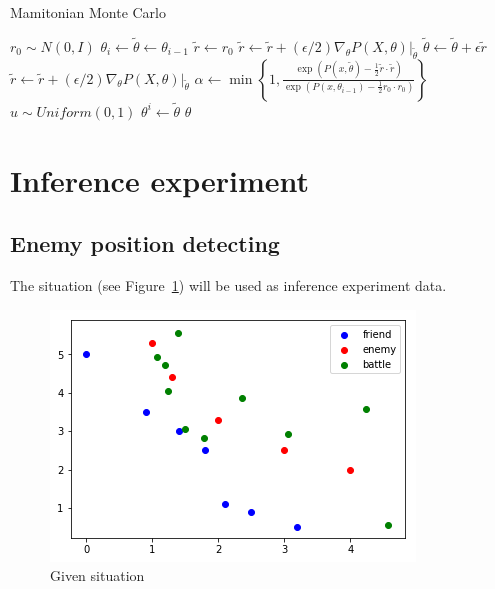 \documentclass{article}
\begin{document}
\begin{algorithm}
\caption{Mamitonian Monte Carlo}
\begin{algorithmic}[1]
        \State $r_0 \sim N(0,I)$
        \State $\theta_i \gets \tilde{\theta} \gets \theta_{i-1}$
        \State $\tilde{r} \gets r_0$
            \State $\tilde{r} \gets \tilde{r} + (\epsilon/2) \nabla_\theta P(X,\theta)|_{\tilde{\theta}}$
            \State $\tilde{\theta} \gets \tilde{\theta} + \epsilon \tilde{r}$
            \State $\tilde{r} \gets \tilde{r} + (\epsilon/2) \nabla_\theta P(X,\theta)|_{\tilde{\theta}}$
        \EndFor
        \State $\alpha \gets \min \left\{ 1, \frac{\exp(P(x,\tilde{\theta})-\frac{1}{2}\tilde{r}\cdot\tilde{r})}{\exp(P(x,\theta_{i-1})-\frac{1}{2}r_0\cdot r_0)} \right\}$
        \State $u \sim Uniform(0,1)$
            \State $\theta^i \gets \tilde{\theta}$
        \EndIf
    \EndFor
    \State \Return $\theta$
\EndProcedure
\end{algorithmic}
\label{alg:hmc}
\end{algorithm}

\section{Inference experiment}

\subsection{Enemy position detecting}

The situation (see Figure~\ref{fig:expState}) will be used as inference experiment data.

\begin{figure}[h]
\includegraphics[width=0.6\linewidth]{exp_state.png}
\caption{Given situation}
\label{fig:expState}
\end{figure}
\end{document}
